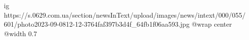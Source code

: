  
 
 
 
 

\ifcmt
  ig https://s.0629.com.ua/section/newsInText/upload/images/news/intext/000/055/601/photo2023-09-0812-12-3764faf397b3d4f_64fb1f06aa593.jpg
  @wrap center
  @width 0.7
\fi
